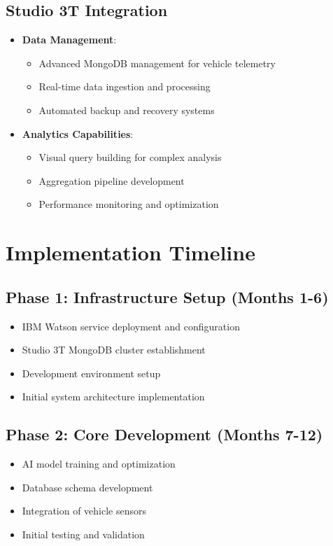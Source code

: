 \documentclass[12pt,a4paper]{article}
\begin{document}
\subsection{Studio 3T Integration}
\begin{itemize}
    \item \textbf{Data Management}:
        \begin{itemize}
            \item Advanced MongoDB management for vehicle telemetry
            \item Real-time data ingestion and processing
            \item Automated backup and recovery systems
        \end{itemize}
    \item \textbf{Analytics Capabilities}:
        \begin{itemize}
            \item Visual query building for complex analysis
            \item Aggregation pipeline development
            \item Performance monitoring and optimization
        \end{itemize}
\end{itemize}

\section{Implementation Timeline}
\subsection{Phase 1: Infrastructure Setup (Months 1-6)}
\begin{itemize}
    \item IBM Watson service deployment and configuration
    \item Studio 3T MongoDB cluster establishment
    \item Development environment setup
    \item Initial system architecture implementation
\end{itemize}

\subsection{Phase 2: Core Development (Months 7-12)}
\begin{itemize}
    \item AI model training and optimization
    \item Database schema development
    \item Integration of vehicle sensors
    \item Initial testing and validation
\end{itemize}
\end{document}
